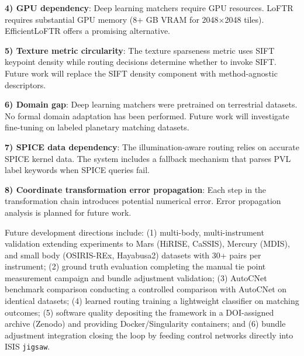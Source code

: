 \documentclass[lettersize,journal]{IEEEtran}
\begin{document}
\textbf{4) GPU dependency}: Deep learning matchers require GPU resources. LoFTR requires substantial GPU memory (8+ GB VRAM for 2048$\times$2048 tiles). EfficientLoFTR \cite{wang2024efficientloftr} offers a promising alternative.

\textbf{5) Texture metric circularity}: The texture sparseness metric uses SIFT keypoint density while routing decisions determine whether to invoke SIFT. Future work will replace the SIFT density component with method-agnostic descriptors.

\textbf{6) Domain gap}: Deep learning matchers were pretrained on terrestrial datasets. No formal domain adaptation has been performed. Future work will investigate fine-tuning on labeled planetary matching datasets.

\textbf{7) SPICE data dependency}: The illumination-aware routing relies on accurate SPICE kernel data. The system includes a fallback mechanism that parses PVL label keywords when SPICE queries fail.

\textbf{8) Coordinate transformation error propagation}: Each step in the transformation chain introduces potential numerical error. Error propagation analysis is planned for future work.

Future development directions include: (1) multi-body, multi-instrument validation extending experiments to Mars (HiRISE, CaSSIS), Mercury (MDIS), and small body (OSIRIS-REx, Hayabusa2) datasets with 30+ pairs per instrument; (2) ground truth evaluation completing the manual tie point measurement campaign and bundle adjustment validation; (3) AutoCNet benchmark comparison conducting a controlled comparison with AutoCNet on identical datasets; (4) learned routing training a lightweight classifier on matching outcomes; (5) software quality depositing the framework in a DOI-assigned archive (Zenodo) and providing Docker/Singularity containers; and (6) bundle adjustment integration closing the loop by feeding control networks directly into ISIS \texttt{jigsaw}.
\end{document}
